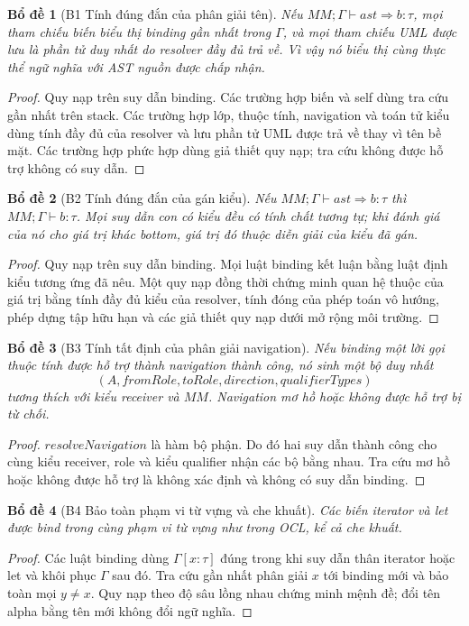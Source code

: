 \documentclass[11pt,a4paper]{article}
\newtheorem{lemma}{Bổ đề}
\theoremstyle{definition}
\begin{document}
\begin{lemma}[B1 Tính đúng đắn của phân giải tên]
Nếu $MM;\Gamma\vdash ast\Rightarrow b:\tau$, mọi tham chiếu biến biểu thị
binding gần nhất trong $\Gamma$, và mọi tham chiếu UML được lưu là phần tử duy
nhất do resolver đầy đủ trả về. Vì vậy nó biểu thị cùng thực thể ngữ nghĩa với
AST nguồn được chấp nhận.
\end{lemma}
\begin{proof}
Quy nạp trên suy dẫn binding. Các trường hợp biến và self dùng tra cứu gần nhất
trên stack. Các trường hợp lớp, thuộc tính, navigation và toán tử kiểu dùng
tính đầy đủ của resolver và lưu phần tử UML được trả về thay vì tên bề mặt.
Các trường hợp phức hợp dùng giả thiết quy nạp; tra cứu không được hỗ trợ không
có suy dẫn.
\end{proof}

\begin{lemma}[B2 Tính đúng đắn của gán kiểu]
Nếu $MM;\Gamma\vdash ast\Rightarrow b:\tau$ thì
$MM;\Gamma\vdash b:\tau$. Mọi suy dẫn con có kiểu đều có tính chất tương tự;
khi đánh giá của nó cho giá trị khác bottom, giá trị đó thuộc diễn giải của
kiểu đã gán.
\end{lemma}
\begin{proof}
Quy nạp trên suy dẫn binding. Mọi luật binding kết luận bằng luật định kiểu
tương ứng đã nêu. Một quy nạp đồng thời chứng minh quan hệ thuộc của giá trị
bằng tính đầy đủ kiểu của resolver, tính đóng của phép toán vô hướng, phép dựng
tập hữu hạn và các giả thiết quy nạp dưới mở rộng môi trường.
\end{proof}

\begin{lemma}[B3 Tính tất định của phân giải navigation]
Nếu binding một lời gọi thuộc tính được hỗ trợ thành navigation thành công, nó
sinh một bộ duy nhất
\[
(A,fromRole,toRole,direction,qualifierTypes)
\]
tương thích với kiểu receiver và $MM$. Navigation mơ hồ hoặc không được hỗ trợ
bị từ chối.
\end{lemma}
\begin{proof}
$resolveNavigation$ là hàm bộ phận. Do đó hai suy dẫn thành công cho cùng kiểu
receiver, role và kiểu qualifier nhận các bộ bằng nhau. Tra cứu mơ hồ hoặc
không được hỗ trợ là không xác định và không có suy dẫn binding.
\end{proof}

\begin{lemma}[B4 Bảo toàn phạm vi từ vựng và che khuất]
Các biến iterator và let được bind trong cùng phạm vi từ vựng như trong OCL,
kể cả che khuất.
\end{lemma}
\begin{proof}
Các luật binding dùng $\Gamma[x:\tau]$ đúng trong khi suy dẫn thân iterator
hoặc let và khôi phục $\Gamma$ sau đó. Tra cứu gần nhất phân giải $x$ tới
binding mới và bảo toàn mọi $y\neq x$. Quy nạp theo độ sâu lồng nhau chứng minh
mệnh đề; đổi tên alpha bằng tên mới không đổi ngữ nghĩa.
\end{proof}
\end{document}
